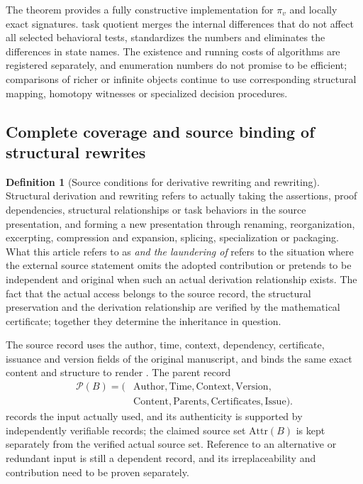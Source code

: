 \documentclass[11pt,a4paper]{article}
\theoremstyle{plain}
\theoremstyle{definition}
\newtheorem{definition}[theorem]{Definition}
\theoremstyle{remark}
\begin{document}
\begin{CJK*}
The theorem provides a fully constructive implementation for $\pi_v$ and locally exact signatures. task quotient merges the internal differences that do not affect all selected behavioral tests, standardizes the numbers and eliminates the differences in state names. The existence and running costs of algorithms are registered separately, and enumeration numbers do not promise to be efficient; comparisons of richer or infinite objects continue to use corresponding structural mapping, homotopy witnesses or specialized decision procedures.

\subsection { Complete coverage and source binding of structural rewrites }\label{ar:coverage}


\begin{definition}
[Source conditions for derivative rewriting and rewriting]Structural derivation and rewriting refers to actually taking the assertions, proof dependencies, structural relationships or task behaviors in the source presentation, and forming a new presentation through renaming, reorganization, excerpting, compression and expansion, splicing, specialization or packaging. What this article refers to as \emph { and the laundering of } refers to the situation where the external source statement omits the adopted contribution or pretends to be independent and original when such an actual derivation relationship exists. The fact that the actual access belongs to the source record, the structural preservation and the derivation relationship are verified by the mathematical certificate; together they determine the inheritance in question.\end{definition}


The source record uses the author, time, context, dependency, certificate, issuance and version fields of the original manuscript, and binds the same exact content and structure to render \cite{S20,S38}. The parent record \[
 \begin{aligned}
 \mathcal P(B)=\bigl(&\mathrm{Author},\mathrm{Time},\mathrm{Context},
                    \mathrm{Version},\\
                   &\mathrm{Content},\mathrm{Parents},
                    \mathrm{Certificates},\mathrm{Issue}\bigr).
 \end{aligned}
\] records the input actually used, and its authenticity is supported by independently verifiable records; the claimed source set $\mathrm{Attr}(B)$ is kept separately from the verified actual source set. Reference to an alternative or redundant input is still a dependent record, and its irreplaceability and contribution need to be proven separately.


\end{CJK*}
\end{document}
